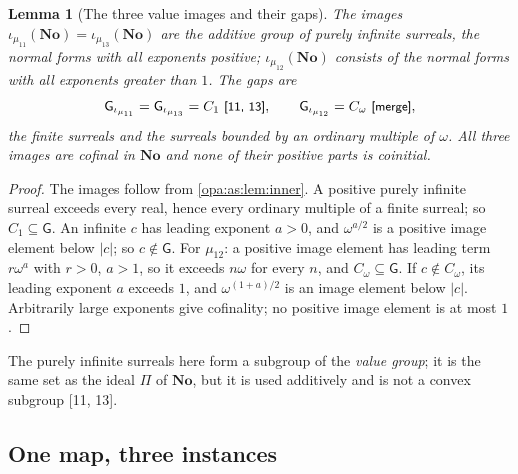 \documentclass[11pt,oneside]{article}
\numberwithin{equation}{section}
\newtheorem{lemma}[lemma]{Lemma}
\theoremstyle{definition}
\theoremstyle{remark}
\newcommand{\No}{\mathbf{No}}
\newcommand{\src}[1]{\textup{\textsf{\small[#1]}}}
\newcommand{\mergetag}{\textup{\textsf{\small[merge]}}}
\newcommand{\gap}{\mathsf G}
\begin{document}
\begin{lemma}[The three value images and their gaps]\label{opa:as:lem:gaps}
The images $\iota_{\mu_{11}}(\No)=\iota_{\mu_{13}}(\No)$ are the additive group of purely infinite
surreals, the normal forms with all exponents positive; $\iota_{\mu_{12}}(\No)$ consists of the normal
forms with all exponents greater than $1$. The gaps are
\[
 \gap_{\iota_{\mu_{11}}}=\gap_{\iota_{\mu_{13}}}=C_1\ \src{11, 13},\qquad
 \gap_{\iota_{\mu_{12}}}=C_\omega\ \mergetag,
\]
the finite surreals and the surreals bounded by an ordinary multiple of $\omega$. All three images are
cofinal in $\No$ and none of their positive parts is coinitial.
\end{lemma}
\begin{proof}
The images follow from \cref{opa:as:lem:inner}. A positive purely infinite surreal exceeds every real,
hence every ordinary multiple of a finite surreal; so $C_1\subseteq\gap$. An infinite $c$ has leading
exponent $a>0$, and $\omega^{a/2}$ is a positive image element below $|c|$; so $c\notin\gap$. For
$\mu_{12}$: a positive image element has leading term $r\omega^a$ with $r>0$, $a>1$, so it exceeds
$n\omega$ for every $n$, and $C_\omega\subseteq\gap$. If $c\notin C_\omega$, its leading exponent $a$
exceeds $1$, and $\omega^{(1+a)/2}$ is an image element below $|c|$. Arbitrarily large exponents give
cofinality; no positive image element is at most $1$.
\end{proof}

The purely infinite surreals here form a subgroup of the \emph{value group}; it is the same set as
the ideal $\Pi$ of $\No$, but it is used additively and is not a convex subgroup \src{11, 13}.

\subsection{One map, three instances}
\end{document}
